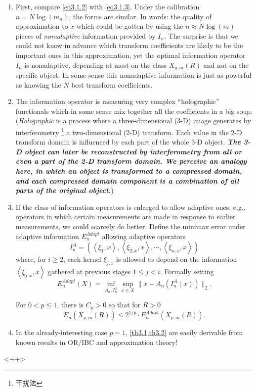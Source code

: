 \begin{enumerate}
    \item First, compare \cref{eq3.1.2} with \cref{eq3.1.3}. Under the calibration $n = N\log(m_n)$, the forms are similar. In words: the quality of approximation to $x$ which could be gotten by using the $n \approx N \log(m)$ pieces of \emph{\textcolor[rgb]{1,0,0}{nonadaptive}} information provided by $I_n$. The surprise is that we could not know in advance which transform coefficients are likely to be the important ones in this approximation, yet the optimal information operator $I_n$ is nonadaptive, depending at most on the class $X_{p,m}(R)$ and not on the specific object. In some sense this nonadaptive information is just as powerful as knowing the $N$ best transform coefficients.
    \item The information operator is measuring very complex ``holographic'' functionals which in some sense mix together all the coefficients in a big soup. (\emph{\textcolor[rgb]{1,0,0}{Holographic}} is a process where a three-dimensional (3-D) image generates by interferometry \footnote{干扰法} a two-dimensional (2-D) transform. Each value in the 2-D transform domain is influenced by each part of the whole 3-D object. \emph{\textbf{\textcolor[rgb]{1,0,0}{The 3-D object can later be reconstructed by interferometry from all or even a part of the 2-D transform domain. We perceive an analogy here, in which an object is transformed to a compressed domain, and each compressed domain component is a combination of all parts of the original object.}}})
    \item  If the class of information operators is enlarged to allow adaptive ones, e.g., operators in which certain measurements are made in response to earlier measurements, we could scarcely do better. Define the minimax error under adaptive information $E_n^{Adapt}$ allowing adaptive operators 
        \begin{equation*}
            I_n^A = (\left<\xi_1,x\right>,\left<\xi_{2,x},x\right>,\cdots,\left<\xi_{n,x},x\right>)
        \end{equation*}
        where, for $i\geq 2$, each kernel $\xi_{j,x}$ is allowed to depend on the information $\left<\xi_{j,x},x\right>$ gathered at previous stages $1 \leq j < i$. Formally setting
        \begin{equation*}
            E_n^{Adapt}(X) = \inf\limits_{A_n,I_n^A} \sup\limits_{x \in X} \|x-A_n \left(I_n^A(x)\right)\|_2.
        \end{equation*}
        \begin{theorem}
            For $0<p\leq 1$, there is $C_p > 0$ so that for $R > 0$
            \begin{equation*}
                E_n(X_{p,m}(R)) \leq 2^{1/p} \cdot E_n^{Adapt}(X_{p,m}(R)).
            \end{equation*}
            \label{th3.2}
        \end{theorem}
    \item In the already-interesting case $p=1$, \cref{th3.1,th3.2} are easily derivable from known results in OR/IBC and approximation theory! 
\end{enumerate}<++>
